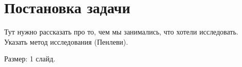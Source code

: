 \section{Постановка задачи}

Тут нужно рассказать про то, чем мы занимались, что хотели исследовать. Указать метод исследования (Пенлеви). 

Размер: 1 слайд.
